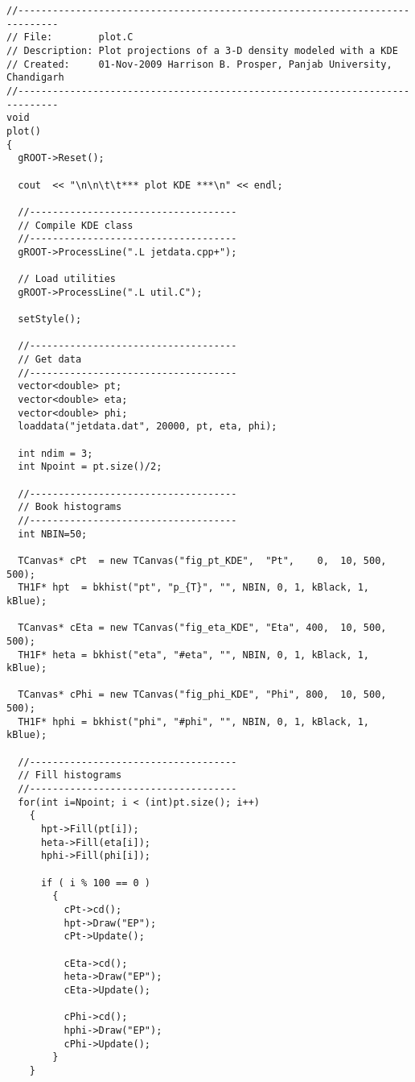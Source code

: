 \footnotesize\begin{verbatim}//-----------------------------------------------------------------------------
// File:        plot.C
// Description: Plot projections of a 3-D density modeled with a KDE
// Created:     01-Nov-2009 Harrison B. Prosper, Panjab University, Chandigarh
//-----------------------------------------------------------------------------
void 
plot()
{
  gROOT->Reset();

  cout  << "\n\n\t\t*** plot KDE ***\n" << endl;
 
  //------------------------------------
  // Compile KDE class
  //------------------------------------
  gROOT->ProcessLine(".L jetdata.cpp+");

  // Load utilities
  gROOT->ProcessLine(".L util.C");
  
  setStyle();

  //------------------------------------
  // Get data
  //------------------------------------
  vector<double> pt;
  vector<double> eta;
  vector<double> phi;
  loaddata("jetdata.dat", 20000, pt, eta, phi);

  int ndim = 3;
  int Npoint = pt.size()/2;
  
  //------------------------------------
  // Book histograms
  //------------------------------------
  int NBIN=50;

  TCanvas* cPt  = new TCanvas("fig_pt_KDE",  "Pt",    0,  10, 500, 500);
  TH1F* hpt  = bkhist("pt", "p_{T}", "", NBIN, 0, 1, kBlack, 1, kBlue);

  TCanvas* cEta = new TCanvas("fig_eta_KDE", "Eta", 400,  10, 500, 500);
  TH1F* heta = bkhist("eta", "#eta", "", NBIN, 0, 1, kBlack, 1, kBlue);

  TCanvas* cPhi = new TCanvas("fig_phi_KDE", "Phi", 800,  10, 500, 500);
  TH1F* hphi = bkhist("phi", "#phi", "", NBIN, 0, 1, kBlack, 1, kBlue);

  //------------------------------------
  // Fill histograms
  //------------------------------------
  for(int i=Npoint; i < (int)pt.size(); i++)
    {
      hpt->Fill(pt[i]);
      heta->Fill(eta[i]);
      hphi->Fill(phi[i]);

      if ( i % 100 == 0 )
        {
          cPt->cd();
          hpt->Draw("EP");
          cPt->Update();

          cEta->cd();
          heta->Draw("EP");
          cEta->Update();

          cPhi->cd();
          hphi->Draw("EP");
          cPhi->Update();
        }
    }


\end{verbatim}
